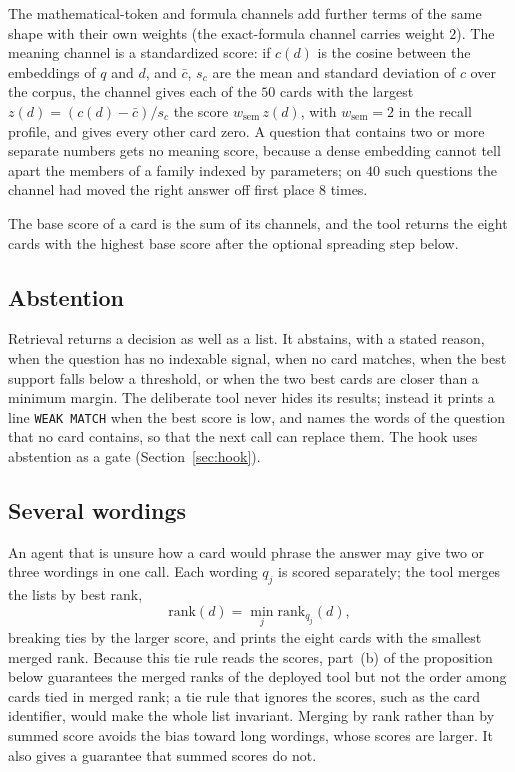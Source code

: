 The mathematical-token and formula channels add further terms of the same shape with their own weights (the exact-formula channel carries weight $2$). The meaning channel is a standardized score: if $c(d)$ is the cosine between the embeddings of $q$ and $d$, and $\bar c$, $s_c$ are the mean and standard deviation of $c$ over the corpus, the channel gives each of the $50$ cards with the largest $z(d)=(c(d)-\bar c)/s_c$ the score $w_{\mathrm{sem}}\,z(d)$, with $w_{\mathrm{sem}}=2$ in the recall profile, and gives every other card zero. A question that contains two or more separate numbers gets no meaning score, because a dense embedding cannot tell apart the members of a family indexed by parameters; on $40$ such questions the channel had moved the right answer off first place $8$ times.

The base score of a card is the sum of its channels, and the tool returns the eight cards with the highest base score after the optional spreading step below.

\subsection{Abstention}
Retrieval returns a decision as well as a list. It abstains, with a stated reason, when the question has no indexable signal, when no card matches, when the best support falls below a threshold, or when the two best cards are closer than a minimum margin. The deliberate tool never hides its results; instead it prints a line \texttt{WEAK MATCH} when the best score is low, and names the words of the question that no card contains, so that the next call can replace them. The hook uses abstention as a gate (Section~\ref{sec:hook}).

\subsection{Several wordings}
An agent that is unsure how a card would phrase the answer may give two or three wordings in one call. Each wording $q_j$ is scored separately; the tool merges the lists by best rank,
\[
\mathrm{rank}(d)=\min_j \mathrm{rank}_{q_j}(d),
\]
breaking ties by the larger score, and prints the eight cards with the smallest merged rank. Because this tie rule reads the scores, part~(b) of the proposition below guarantees the merged ranks of the deployed tool but not the order among cards tied in merged rank; a tie rule that ignores the scores, such as the card identifier, would make the whole list invariant. Merging by rank rather than by summed score avoids the bias toward long wordings, whose scores are larger. It also gives a guarantee that summed scores do not.

